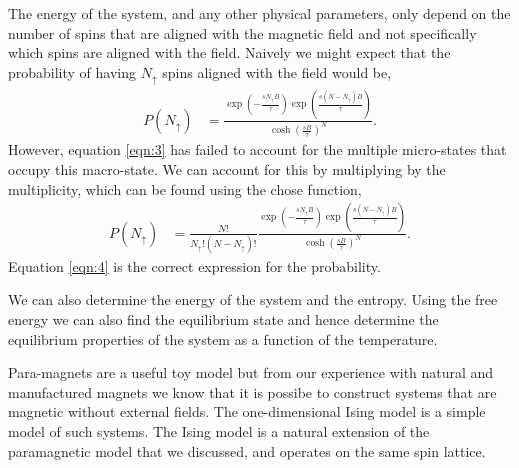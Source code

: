 \documentclass[a4paper]{article}
\begin{document}
\begin{multicols}{2}
        The energy of the system, and any other physical %
        parameters, only depend on the number of spins that are %
        aligned with the magnetic field and not specifically %
        which spins are aligned with the field. Naively we might %
        expect that the probability of having \(N_{\uparrow}\) %
        spins aligned with the field would be,
        \begin{align}
            P(N_{\uparrow}) &= \frac{
                    \exp\left(-\frac{sN_{\uparrow}B}{\tau}\right)
                    \exp\left(\frac{s(N - N_{\uparrow})B}{\tau}\right)}{
                    \cosh\left(\frac{sB}{\tau}\right)^{N}}.
            \label{eqn:3}
        \end{align}
        However, equation \ref{eqn:3} has failed to account for the %
        multiple micro-states that occupy this macro-state. We can %
        account for this by multiplying by the multiplicity, which %
        can be found using the chose function,
        \begin{align}
            P(N_{\uparrow}) &= \frac{N!}{N_{\uparrow}!(N - N_{\uparrow})!}
                    \frac{\exp\left(-\frac{sN_{\uparrow}B}{\tau}\right)
                    \exp\left(\frac{s(N - N_{\uparrow})B}{\tau}\right)}{
                    \cosh\left(\frac{sB}{\tau}\right)^{N}}.
            \label{eqn:4}
        \end{align}
        Equation \ref{eqn:4} is the correct expression for the probability.


        We can also determine the energy of the system and the entropy. %
        Using the free energy we can also find the equilibrium state and %
        hence determine the equilibrium properties of the system as a %
        function of the temperature.




        Para-magnets are a useful toy model but from our experience %
        with natural and manufactured magnets we know that it is %
        possibe to construct systems that are magnetic without external %
        fields. The one-dimensional Ising model is a simple model of %
        such systems. The Ising model is a natural extension of the %
        paramagnetic model that we discussed, and operates on the same %
        spin lattice. 



\end{multicols}
\end{document}
